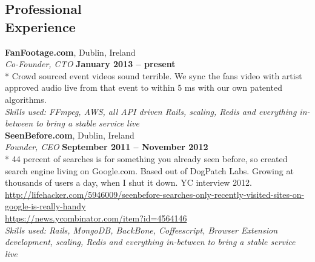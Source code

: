 \documentclass[margin,line]{resume}
\begin{document}
\begin{resume}

    \section{\mysidestyle Professional\\Experience}


    \textbf{FanFootage.com}, Dublin, Ireland \vspace{2mm}\\\vspace{1mm}%
    \textsl{Co-Founder, CTO} \hfill \textbf{January 2013 -- present}\\*
    Crowd sourced event videos sound terrible. We sync the fans video with artist approved audio live from that event to within 5 ms with our own patented algorithms.  \vspace{1mm}\\%
    \textsl{Skills used: FFmpeg, AWS, all API driven Rails, scaling, Redis and everything in-between to bring a stable service live  } \vspace{1mm} \\



    \textbf{SeenBefore.com}, Dublin, Ireland \vspace{2mm}\\\vspace{1mm}%
    \textsl{Founder, CEO} \hfill \textbf{September 2011 -- November 2012}\\*
    44 percent of searches is for something you already seen before, so created search engine living on Google.com. Based out of DogPatch Labs. Growing at thousands of users a day, when I shut it down. YC interview 2012. \vspace{1mm}\\%
   \href{http://lifehacker.com/5946009/seenbefore-searches-only-recently-visited-sites-on-google-is-really-handy}{http://lifehacker.com/5946009/seenbefore-searches-only-recently-visited-sites-on-google-is-really-handy}
   \\
   \href{https://news.ycombinator.com/item?id=4564146}{https://news.ycombinator.com/item?id=4564146} \vspace{1mm} \vspace{1mm}\\%
    \textsl{Skills used: Rails, MongoDB, BackBone, Coffeescript, Browser Extension development, scaling, Redis and everything in-between to bring a stable service live  } \vspace{1mm} \\
    \clearpage




\end{resume}
\end{document}
